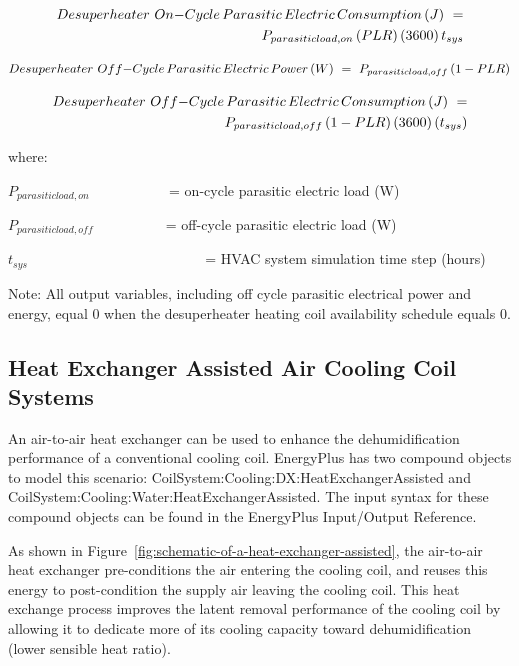 \begin{equation}
\begin{split}
Desuperheater\,\,On{\rm{ - }}Cycle\,Parasitic\,Electric\,Consumption\,(J)\,\, = \\{P_{parasiticload,on}}\left( {PLR} \right)\left( {3600} \right){t_{sys}}
\end{split}
\end{equation}

\begin{equation}
Desuperheater\,\,Off{\rm{ - }}Cycle\,Parasitic\,Electric\,Power\,(W)\,\, = \,\,{P_{parasiticload,off}}\left( {1 - PLR} \right)
\end{equation}

\begin{equation}
\begin{split}
Desuperheater\,\,Off{\rm{ - }}Cycle\,Parasitic\,Electric\,Consumption\,(J)\,\, = \\{P_{parasiticload,off}}\left( {1 - PLR} \right)\left( {3600} \right)\left( {{t_{sys}}} \right)
\end{split}
\end{equation}

where:

\({P_{parasiticload,on}}\) ~~~~~~~~~~ = on-cycle parasitic electric load (W)

\({P_{parasiticload,off}}\) ~~~~~~~~~ = off-cycle parasitic electric load (W)

\({t_{sys}}\) ~~~~~~~~~~~~~~~~~~~~~~~~ = HVAC system simulation time step (hours)

Note: All output variables, including off cycle parasitic electrical power and energy, equal 0 when the desuperheater heating coil availability schedule equals 0.

\subsection{Heat Exchanger Assisted Air Cooling Coil Systems}\label{heat-exchanger-assisted-air-cooling-coil-systems}

An air-to-air heat exchanger can be used to enhance the dehumidification performance of a conventional cooling coil. EnergyPlus has two compound objects to model this scenario: CoilSystem:Cooling:DX:HeatExchangerAssisted and CoilSystem:Cooling:Water:HeatExchangerAssisted. The input syntax for these compound objects can be found in the EnergyPlus Input/Output Reference.

As shown in Figure~\ref{fig:schematic-of-a-heat-exchanger-assisted}, the air-to-air heat exchanger pre-conditions the air entering the cooling coil, and reuses this energy to post-condition the supply air leaving the cooling coil. This heat exchange process improves the latent removal performance of the cooling coil by allowing it to dedicate more of its cooling capacity toward dehumidification (lower sensible heat ratio).

